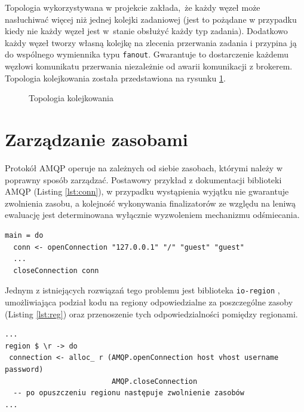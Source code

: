 Topologia wykorzystywana w projekcie zakłada, że każdy węzeł może nasłuchiwać więcej niż jednej kolejki zadaniowej (jest to pożądane w przypadku kiedy nie każdy węzeł jest w~stanie obsłużyć każdy typ zadania). Dodatkowo każdy węzeł tworzy własną kolejkę na zlecenia przerwania zadania i przypina ją do wspólnego wymiennika typu \lstinline{fanout}. Gwarantuje to dostarczenie każdemu węzłowi komunikatu przerwania niezależnie od awarii komunikacji z brokerem. Topologia kolejkowania została przedstawiona na rysunku \ref{fig:topo}.

\begin{figure}[h]
\resizebox{\textwidth}{!}{%

}%
\caption{Topologia kolejkowania}
\label{fig:topo}
\end{figure}

\section{Zarządzanie zasobami}
Protokół AMQP operuje na zależnych od siebie zasobach, którymi należy w poprawny sposób zarządzać. Postawowy przykład z dokumentacji biblioteki AMQP (Listing \ref{lst:conn}), w przypadku wystąpienia wyjątku nie gwarantuje zwolnienia zasobu, a kolejność wykonywania finalizatorów ze względu na leniwą ewaluację jest determinowana wyłącznie wyzwoleniem mechanizmu odśmiecania.

\begin{lstlisting}[caption=Łączenie z RabbitMQ, label=lst:conn]
main = do
  conn <- openConnection "127.0.0.1" "/" "guest" "guest"
  ...
  closeConnection conn
\end{lstlisting}

Jednym z istniejących rozwiązań tego problemu jest biblioteka \texttt{io-region} \cite{IoReg}, umożliwiająca podział kodu na regiony odpowiedzialne za poszczególne zasoby (Listing \ref{lst:reg}) oraz przenoszenie tych odpowiedzialności pomiędzy regionami.
\begin{lstlisting}[caption=Regionalizacja zasobów, label=lst:reg]
...
region $ \r -> do
 connection <- alloc_ r (AMQP.openConnection host vhost username password)
                         AMQP.closeConnection
  -- po opuszczeniu regionu następuje zwolnienie zasobów
...
\end{lstlisting}

